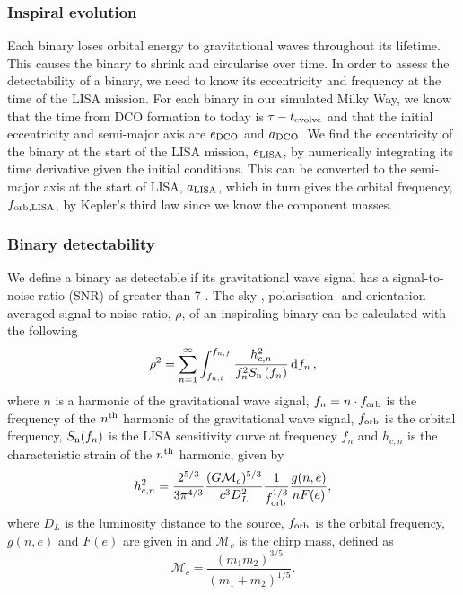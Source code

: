 \subsubsection{Inspiral evolution}

Each binary loses orbital energy to gravitational waves throughout its lifetime. This causes the binary to shrink and circularise over time. In order to assess the detectability of a binary, we need to know its eccentricity and frequency at the time of the LISA mission. For each binary in our simulated Milky Way, we know that the time from DCO formation to today is $\tau - t_{\rm evolve}$ and that the initial eccentricity and semi-major axis are $e_{\rm DCO}$ and $a_{\rm DCO}$. We find the eccentricity of the binary at the start of the LISA mission, $e_{\rm LISA}$, by numerically integrating its time derivative \citep[][Eq. 5.13]{Peters+1964} given the initial conditions. This can be converted to the semi-major axis at the start of LISA, $a_{\rm LISA} $\citep[][Eq. 5.11]{Peters+1964}, which in turn gives the orbital frequency, $f_{\rm orb, LISA}$, by Kepler's third law since we know the component masses.

\subsubsection{Binary detectability}

We define a binary as detectable if its gravitational wave signal has a signal-to-noise ratio (SNR) of greater than 7 \citep[e.g.][]{Breivik+2020, Korol+2020}. The sky-, polarisation- and orientation-averaged signal-to-noise ratio, $\rho$, of an inspiraling binary can be calculated with the following \citep[e.g.][]{Finn+2000}
\begin{equation}\label{eq:snr}
    \rho^2 = \sum_{n=1}^{\infty} \int_{f_{n, i}}^{f_{n, f}} \frac{h_{c, n}^{2}}{f_{n}^{2} S_{\rm n}\left(f_{n}\right)} \dd{f_n},
\end{equation}
where $n$ is a harmonic of the gravitational wave signal, $f_n = n \cdot f_{\rm orb}$ is the frequency of the $n^{\rm th}$ harmonic of the gravitational wave signal, $f_{\rm orb}$ is the orbital frequency, $S_{\rm n}(f_n)$ is the LISA sensitivity curve at frequency $f_n$ \citep[e.g.][]{Robson+2019} and $h_{c,n}$ is the characteristic strain of the $n^{\rm th}$ harmonic, given by \citep[e.g.][]{Barack+2004}
\begin{equation}\label{eq:charstrain}
    h^2_{c,n} = \frac{2^{5/3}}{3 \pi^{4/3}} \frac{(G \mathcal{M}_c)^{5/3}}{c^3 D_L^2} \frac{1}{f_{\rm orb}^{1/3}} \frac{g(n,e)}{n F(e)},
\end{equation}
where $D_L$ is the luminosity distance to the source, $f_{\rm orb}$ is the orbital frequency, $g(n, e)$ and $F(e)$ are given in \citet{Peters+1963} and $\mathcal{M}_c$ is the chirp mass, defined as
\begin{equation}\label{eq:chirp_mass}
    \mathcal{M}_c = \frac{(m_1 m_2)^{3/5}}{(m_1 + m_2)^{1/5}}.
\end{equation}

